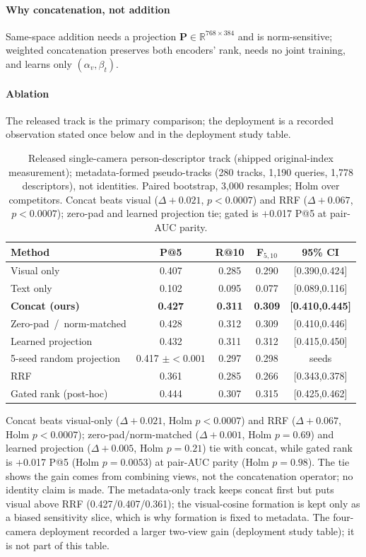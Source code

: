 ﻿\documentclass[conference]{IEEEtran}
\theoremstyle{plain}
\begin{document}
\paragraph*{Why concatenation, not addition}
Same-space addition needs a projection $\mathbf{P}\in\mathbb{R}^{768\times 384}$ and is norm-sensitive; weighted concatenation preserves both encoders' rank, needs no joint training, and learns only $(\alpha_v,\beta_t)$.

\paragraph*{Ablation}
The released track is the primary comparison; the deployment is a recorded observation stated once below and in the deployment study table.

\begin{table}[!t]
\caption{Released single-camera person-descriptor track (shipped original-index measurement); metadata-formed pseudo-tracks (280 tracks, 1{,}190 queries, 1{,}778 descriptors), not identities. Paired bootstrap, 3{,}000 resamples; Holm over competitors. Concat beats visual ($\Delta{+}0.021$, $p{<}0.0007$) and RRF ($\Delta{+}0.067$, $p{<}0.0007$); zero-pad and learned projection tie; gated is $+$0.017 P@5 at pair-AUC parity.}
\label{tab:fusion_ablation}
\centering
\footnotesize
\begin{tabular}{@{}lcccc@{}}
\toprule
Method & P@5 & R@10 & F$_{5,10}$ & 95\% CI \\
\midrule
Visual only & 0.407 & 0.285 & 0.290 & [0.390,0.424] \\
Text only & 0.102 & 0.095 & 0.077 & [0.089,0.116] \\
\textbf{Concat (ours)} & \textbf{0.427} & \textbf{0.311} & \textbf{0.309} & \textbf{[0.410,0.445]} \\
Zero-pad~/~norm-matched & 0.428 & 0.312 & 0.309 & [0.410,0.446] \\
Learned projection & 0.432 & 0.311 & 0.312 & [0.415,0.450] \\
5-seed random projection & 0.417 $\pm{<}0.001$ & 0.297 & 0.298 & seeds \\
RRF & 0.361 & 0.285 & 0.266 & [0.343,0.378] \\
Gated rank (post-hoc) & 0.444 & 0.307 & 0.315 & [0.425,0.462] \\
\bottomrule
\end{tabular}
\end{table}

Concat beats visual-only ($\Delta{+}0.021$, Holm $p{<}0.0007$) and RRF ($\Delta{+}0.067$, Holm $p{<}0.0007$); zero-pad/norm-matched ($\Delta{+}0.001$, Holm $p{=}0.69$) and learned projection ($\Delta{+}0.005$, Holm $p{=}0.21$) tie with concat, while gated rank is $+$0.017 P@5 (Holm $p{=}0.0053$) at pair-AUC parity (Holm $p{=}0.98$). The tie shows the gain comes from combining views, not the concatenation operator; no identity claim is made. The metadata-only track keeps concat first but puts visual above RRF (0.427/0.407/0.361); the visual-cosine formation is kept only as a biased sensitivity slice, which is why formation is fixed to metadata. The four-camera deployment recorded a larger two-view gain (deployment study table); it is not part of this table.
\end{document}
